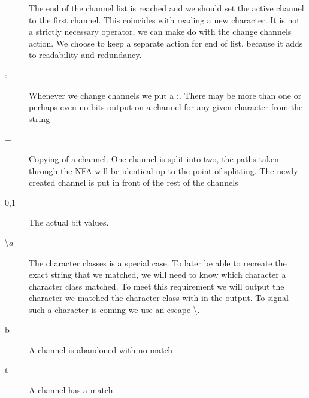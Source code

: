 \begin{description}
  \item[\textbar] The end of the channel list is reached and we should
    set the active channel to the first channel. This coincides with
    reading a new character. It is not a strictly necessary operator,
    we can make do with the change channels action. We choose to keep
    a separate action for end of list, because it adds to readability
    and redundancy.
  \item[:] Whenever we change channels we put a :. There may be more
    than one or perhaps even no bits output on a channel for any given
    character from the string
  \item[=] Copying of a channel. One channel is split into two, the
    paths taken through the NFA will be identical up to the point of
    splitting. The newly created channel is put in front of the rest
    of the channels
  \item[0,1] The actual bit values. 
  \item [\textbackslash $a$] The character classes is a special
    case. To later be able to recreate the exact string that we
    matched, we will need to know which character a character class
    matched. To meet this requirement we will output the character we
    matched the character class with in the output. To signal such a
    character is coming we use an escape \textbackslash.
  \item[b] A channel is abandoned with no match
  \item[t] A channel has a match
\end{description}

